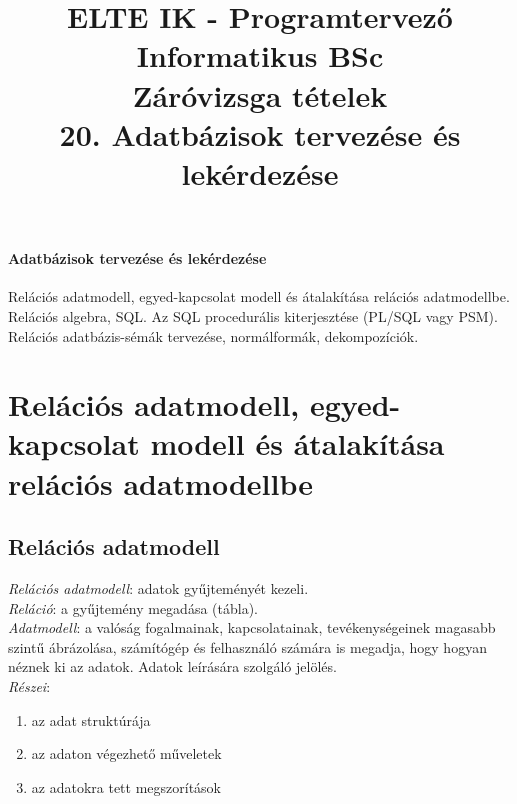 \documentclass[margin=0px]{article}
\title{\textbf{{\Large ELTE IK - Programtervező Informatikus BSc} \vspace{0.2cm} \\ {\huge Záróvizsga tételek}} \vspace{0.3cm} \\ 20. Adatbázisok tervezése és lekérdezése}
\author{}
\date{}
\newenvironment{tetel}[1]{\paragraph{#1 \\}}{}
\begin{document}
\maketitle

\begin{tetel}{Adatbázisok tervezése és lekérdezése}
    Relációs adatmodell, egyed-kapcsolat modell és átalakítása relációs adatmodellbe. Relációs algebra, SQL. Az SQL procedurális kiterjesztése (PL/SQL vagy PSM). Relációs adatbázis-sémák tervezése, normálformák, dekompozíciók.
\end{tetel}

\section{Relációs adatmodell, egyed-kapcsolat modell és átalakítása relációs adatmodellbe}

\subsection{Relációs adatmodell}

\textit{Relációs adatmodell}: adatok gyűjteményét kezeli. \\
\textit{Reláció}: a gyűjtemény megadása (tábla). \\
\textit{Adatmodell}: a valóság fogalmainak, kapcsolatainak, tevékenységeinek magasabb szintű ábrázolása, számítógép és felhasználó számára is megadja, hogy hogyan néznek ki az adatok. Adatok leírására szolgáló jelölés. \\
\textit{Részei}:
\begin{enumerate}
    \item az adat struktúrája
    \item az adaton végezhető műveletek
    \item az adatokra tett megszorítások
\end{enumerate}
\end{document}

